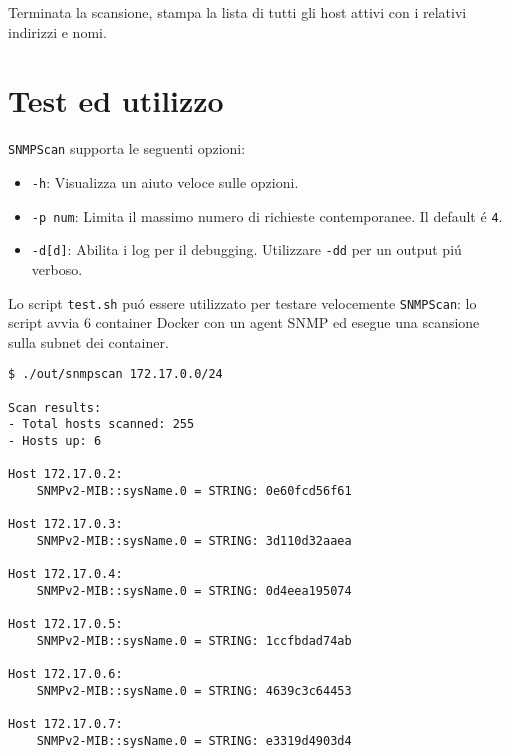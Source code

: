 \documentclass{article}
\providecommand{\inlinecode}[1]{\texttt{#1}}
\begin{document}
Terminata la scansione, stampa la lista di tutti gli host attivi con i relativi indirizzi e nomi.



\section{Test ed utilizzo}

\inlinecode{SNMPScan} supporta le seguenti opzioni:

\begin{itemize}
\item \inlinecode{-h}: Visualizza un aiuto veloce sulle opzioni.
\item \inlinecode{-p num}: Limita il massimo numero di richieste contemporanee.
      Il default \'{e} \inlinecode{4}.
\item \inlinecode{-d[d]}: Abilita i log per il debugging.
      Utilizzare \inlinecode{-dd} per un output pi\'{u} verboso.
\end{itemize}

Lo script \inlinecode{test.sh} pu\'{o} essere utilizzato per testare velocemente \inlinecode{SNMPScan}:
lo script avvia 6 container Docker con un agent SNMP ed esegue una scansione sulla subnet dei container.

\begin{lstlisting}
$ ./out/snmpscan 172.17.0.0/24

Scan results:
- Total hosts scanned: 255
- Hosts up: 6

Host 172.17.0.2:
    SNMPv2-MIB::sysName.0 = STRING: 0e60fcd56f61

Host 172.17.0.3:
    SNMPv2-MIB::sysName.0 = STRING: 3d110d32aaea

Host 172.17.0.4:
    SNMPv2-MIB::sysName.0 = STRING: 0d4eea195074

Host 172.17.0.5:
    SNMPv2-MIB::sysName.0 = STRING: 1ccfbdad74ab

Host 172.17.0.6:
    SNMPv2-MIB::sysName.0 = STRING: 4639c3c64453

Host 172.17.0.7:
    SNMPv2-MIB::sysName.0 = STRING: e3319d4903d4
\end{lstlisting}
\end{document}
